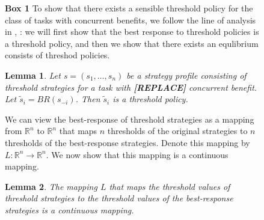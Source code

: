 \documentclass{nature}
\newtheorem{lemma}{Lemma}
\def\R{\mathbb{R}}    %
\begin{document}
\nolinenumbers
\begin{figure}
\begin{framed}
\textbf{Box 1} %
%
To show that there exists a sensible threshold policy for the class of tasks with concurrent benefits, we follow the line of analysis in \cite{Carlsson1993}, \cite{Morris2000}:
we will first show that the best response to threshold policies is a threshold policy, and then we show that there exists an equlibrium consists of threshod policies. 
\begin{lemma}\label{lemma:thresholdBR}
Let $s=(s_1,\ldots,s_n)$ be a strategy profile consisting of threshold strategies for a task with \textbf{[REPLACE]} concurrent benefit. Let $\tilde{s}_i=BR(s_{-i})$. Then $\tilde{s}_i$ is a threshold policy. 
\end{lemma} 


We can view the best-response of threshold strategies as a mapping from $\R^n$ to $\R^n$ that maps $n$ thresholds of the original strategies to $n$ thresholds of the best-response strategies. Denote this mapping by $L:\R^n\to\R^n$. We now show that this mapping is a continuous mapping.

\begin{lemma}\label{lemma:continuous}
The mapping $L$ that maps the threshold values of threshold strategies to the threshold values of the best-response strategies is a continuous mapping. 
\end{lemma}


\end{framed}
\end{figure}
\end{document}
